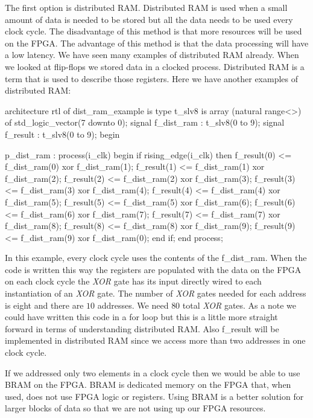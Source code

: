The first option is distributed \ac{RAM}. Distributed \ac{RAM} is used when a small amount of data is needed to be stored but all the data needs to be used every clock cycle. The disadvantage of this method is that more resources will be used on the \ac{FPGA}. The advantage of this method is that the data processing will have a low latency. We have seen many examples of distributed \ac{RAM} already. When we looked at flip-flops we stored data in a clocked process. Distributed \ac{RAM} is a term that is used to describe those registers. Here we have another examples of distributed \ac{RAM}:

\begin{VHDLlisting}[tabsize=4]
architecture rtl of dist_ram_example is
  type t_slv8 is array (natural range<>) of std_logic_vector(7 downto 0);
  signal f_dist_ram : t_slv8(0 to 9);
  signal f_result   : t_slv8(0 to 9);
begin

p_dist_ram : process(i_clk)
begin
    if rising_edge(i_clk) then
        f_result(0) <= f_dist_ram(0) xor f_dist_ram(1);
        f_result(1) <= f_dist_ram(1) xor f_dist_ram(2);
        f_result(2) <= f_dist_ram(2) xor f_dist_ram(3);
        f_result(3) <= f_dist_ram(3) xor f_dist_ram(4);
        f_result(4) <= f_dist_ram(4) xor f_dist_ram(5);
        f_result(5) <= f_dist_ram(5) xor f_dist_ram(6);
        f_result(6) <= f_dist_ram(6) xor f_dist_ram(7);
        f_result(7) <= f_dist_ram(7) xor f_dist_ram(8);
        f_result(8) <= f_dist_ram(8) xor f_dist_ram(9);
        f_result(9) <= f_dist_ram(9) xor f_dist_ram(0);
    end if;
end process;
\end{VHDLlisting}

In this example, every clock cycle uses the contents of the f\_dist\_ram. When the code is written this way the registers are populated with the data on the \ac{FPGA} on each clock cycle the \emph{XOR} gate has its input directly wired to each instantiation of an \emph{XOR} gate. The number of \emph{XOR} gates needed for each address is eight and there are $10$ addresses. We need $80$ total \emph{XOR} gates. As a note we could have written this code in a for loop but this is a little more straight forward in terms of understanding distributed \ac{RAM}. Also f\_result will be implemented in distributed \ac{RAM} since we access more than two addresses in one clock cycle. 

If we addressed only two elements in a clock cycle then we would be able to use \ac{BRAM} on the \ac{FPGA}. \ac{BRAM} is dedicated memory on the \ac{FPGA} that, when used, does not use \ac{FPGA} logic or registers. Using \ac{BRAM} is a better solution for larger blocks of data so that we are not using up our \ac{FPGA} resources. 

